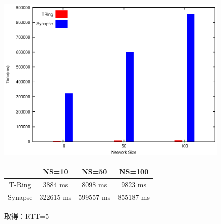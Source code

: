 \begin{figure}[htbp]
\begin{minipage}{1\textwidth}
    \centering
\includegraphics[width=14cm]{./images/compare_retrieve_rtt5.eps}
\begin{center}
  \begin{tabular}{|c||c|c|c|} \hline
    \backslashbox{}{} & NS=10 & NS=50 & NS=100  \\ \hline \hline
       T-Ring & 3884 ms & 8098 ms & 9823 ms  \\ \hline
       Synapse & 322615  ms & 599557 ms & 855187 ms \\ \hline
  \end{tabular}
\end{center}
\caption{取得：RTT=5}
 \label{fig:compare_retrieve_rtt5}
 \end{minipage}
\end{figure}

